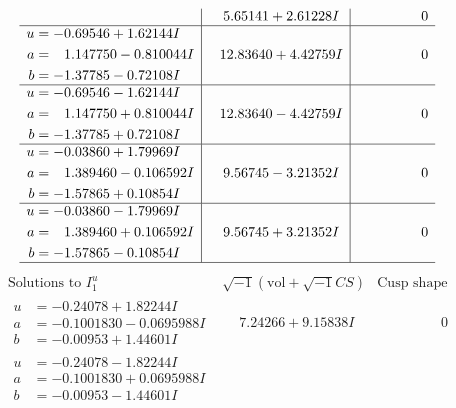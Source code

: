 \documentclass[1p]{elsarticle_modified}
\theoremstyle{definition}
\newcommand{\I}{\sqrt{-1}}
\begin{document}
$$\begin{array}{c|c|c}
 & \phantom{-}5.65141 + 2.61228 I & \phantom{-0.000000 } 0 \\ \hline\begin{aligned}
u &= -0.69546 + 1.62144 I \\
a &= \phantom{-}1.147750 - 0.810044 I \\
b &= -1.37785 - 0.72108 I\end{aligned}
 & \phantom{-}12.83640 + 4.42759 I & \phantom{-0.000000 } 0 \\ \hline\begin{aligned}
u &= -0.69546 - 1.62144 I \\
a &= \phantom{-}1.147750 + 0.810044 I \\
b &= -1.37785 + 0.72108 I\end{aligned}
 & \phantom{-}12.83640 - 4.42759 I & \phantom{-0.000000 } 0 \\ \hline\begin{aligned}
u &= -0.03860 + 1.79969 I \\
a &= \phantom{-}1.389460 - 0.106592 I \\
b &= -1.57865 + 0.10854 I\end{aligned}
 & \phantom{-}9.56745 - 3.21352 I & \phantom{-0.000000 } 0 \\ \hline\begin{aligned}
u &= -0.03860 - 1.79969 I \\
a &= \phantom{-}1.389460 + 0.106592 I \\
b &= -1.57865 - 0.10854 I\end{aligned}
 & \phantom{-}9.56745 + 3.21352 I & \phantom{-0.000000 } 0\\
 \hline 
 \end{array}$$\newpage$$\begin{array}{c|c|c}  
\text{Solutions to }I^u_{1}& \I (\text{vol} + \sqrt{-1}CS) & \text{Cusp shape}\\
 \hline 
\begin{aligned}
u &= -0.24078 + 1.82244 I \\
a &= -0.1001830 - 0.0695988 I \\
b &= -0.00953 + 1.44601 I\end{aligned}
 & \phantom{-}7.24266 + 9.15838 I & \phantom{-0.000000 } 0 \\ \hline\begin{aligned}
u &= -0.24078 - 1.82244 I \\
a &= -0.1001830 + 0.0695988 I \\
b &= -0.00953 - 1.44601 I\end{aligned}

\end{array}$$
\end{document}
